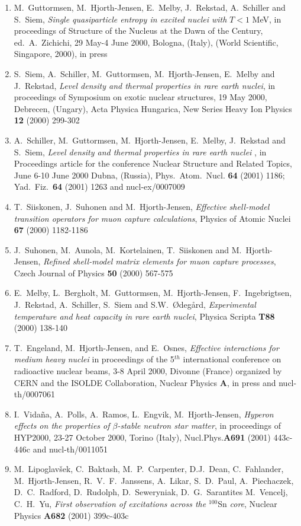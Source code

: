 \begin{enumerate}
\item  M.\ Guttormsen, M.\ Hjorth-Jensen, E.\ Melby,  
       J.\ Rekstad,  A.\ Schiller and S.\ Siem,
       {\em Single quasiparticle entropy in excited nuclei with} $T < 1$ MeV, 
in proceedings of Structure of the Nucleus at the Dawn of the Century, ed.~A.~Zichichi, 29 May-4 June 2000, Bologna, (Italy), (World Scientific, Singapore, 2000), in press 
\item  S.\ Siem, A.\ Schiller, M.\ Guttormsen, M.\ Hjorth-Jensen, E.\ Melby  
       and J.\ Rekstad,
       {\em Level density and thermal properties in rare earth nuclei},
in proceedings of 
                  Symposium on exotic nuclear structures, 19 May 2000, Debrecen,
(Ungary), Acta Physica Hungarica, New Series Heavy Ion Physics
          {\bf 12} (2000) 299-302
\item  A.\ Schiller, M.\ Guttormsen, M.\ Hjorth-Jensen, E.\ Melby,  
       J.\ Rekstad and S.\ Siem,
       {\em Level density and thermal properties in rare earth nuclei }, in 
 Proceedings article for the conference Nuclear Structure and Related Topics, 
       June 6-10 June 2000 Dubna, (Russia), Phys.\ Atom.\ Nucl. {\bf 64} 
       (2001) 
       1186; Yad.\ Fiz.\ {\bf 64} (2001) 1263
       and nucl-ex/0007009
\item T.\ Siiskonen, J.\ Suhonen and M.\ Hjorth-Jensen, {\em  
      Effective shell-model transition operators for muon 
      capture calculations}, 
      Physics of Atomic Nuclei {\bf 67} (2000) 1182-1186
\item J.\ Suhonen, M.\ Aunola, M.\ Kortelainen, T.\ Siiskonen 
      and M.\ Hjorth-Jensen, {\em  
      Refined shell-model matrix elements for muon 
      capture processes}, 
      Czech Journal of Physics {\bf 50} (2000) 567-575
\item  E.\ Melby, L.\ Bergholt, M.\ Guttormsen, M.\ Hjorth-Jensen,
       F.\ Ingebrigtsen, J.\ Rekstad, A.\ Schiller, S.\ Siem and
       S.W.\ \O deg\aa rd,  
       {\em Experimental temperature and heat capacity in rare earth 
            nuclei}, 
       Physica Scripta {\bf T88} (2000) 138-140
\item T.~Engeland, M.\ Hjorth-Jensen, and E.~Osnes, {\em  Effective interactions for medium heavy nuclei}
in 
      proceedings of the
      5$^{th}$ international conference on radioactive nuclear beams, 3-8
       April 2000, Divonne (France) organized by CERN and the ISOLDE Collaboration,
       Nuclear Physics {\bf A}, in press and nucl-th/0007061
\item I.~Vida\~na, A.~Polls, A.~Ramos, L.~Engvik, M.~Hjorth-Jensen, 
      {\em  Hyperon effects on the properties of $\beta$-stable neutron star matter}, in proceedings of HYP2000, 23-27 October 2000, Torino (Italy), 
Nucl.Phys.{\bf A691} (2001) 443c-446c
 and nucl-th/0011051
\item 
M.~Lipoglav\v{s}ek, C.~Baktash,
M.~P.~Carpenter, D.J.~Dean, C.~Fahlander,
M.~Hjorth-Jensen, R.~V.~F.~Janssens, A.~Likar,
S.~D.~Paul, A.~Piechaczek, D.~C.~Radford,
D.~Rudolph, D.~Seweryniak, D.~G.~Sarantites M.~Vencelj, C.~H.~Yu,
{\em First observation of excitations across the } $^{100}$Sn {\em core}, 
Nuclear Physics {\bf A682} (2001) 399c-403c


\end{enumerate}
